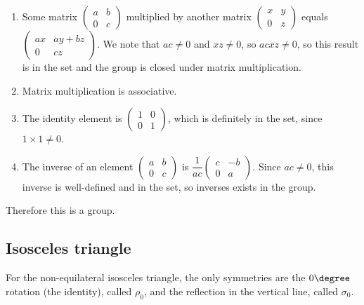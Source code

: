 \documentclass[a4paper]{article}
\begin{document}
\begin{enumerate}
	\item Some matrix $\begin{pmatrix}a & b\\ 0 & c\end{pmatrix}$ multiplied by another matrix $\begin{pmatrix}x & y\\ 0 & z\end{pmatrix}$ equals $\begin{pmatrix}ax & ay + bz\\ 0 & cz\end{pmatrix}$. We note that $ac \ne 0$ and $xz \ne 0$, so $acxz \ne 0$, so this result is in the set and the group is closed under matrix multiplication.
	\item Matrix multiplication is associative.
	\item The identity element is $\begin{pmatrix}1 & 0\\ 0 & 1\end{pmatrix}$, which is definitely in the set, since $1 \times 1 \ne 0$.
	\item The inverse of an element $\begin{pmatrix}a & b\\ 0 & c\end{pmatrix}$ is $\dfrac1{ac} \begin{pmatrix}c & -b\\ 0 & a\end{pmatrix}$. Since $ac \ne 0$, this inverse is well-defined and in the set, so inverses exists in the group.
\end{enumerate}

Therefore this is a group.


\subsection{Isosceles triangle}

For the non-equilateral isosceles triangle, the only symmetries are the $0\degree$ rotation (the identity), called $\rho_0$, and the reflection in the vertical line, called $\sigma_0$.

\begin{center}
\end{center}
\end{document}
